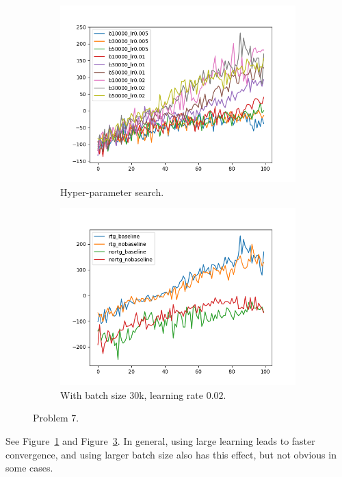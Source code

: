\begin{figure}[htbp]
    \begin{subfigure}[b]{0.5\linewidth}
        \centering
        \includegraphics[width=1.0\linewidth]{figures/p7-hyper.png}
        \caption{Hyper-parameter search. }
        \label{fig:p7-hyper}
    \end{subfigure}
    \begin{subfigure}[b]{0.5\linewidth}
        \centering
        \includegraphics[width=1.0\linewidth]{figures/p7-final.png}
        \caption{With batch size 30k, learning rate $0.02$.}
        \label{fig:p7-final}
    \end{subfigure}
    \caption{Problem 7.}
\end{figure}

See Figure~\ref{fig:p7-hyper} and Figure~\ref{fig:p7-final}. In general, using large learning leads to faster convergence, and using larger batch size also has this effect, but not obvious in some cases.
